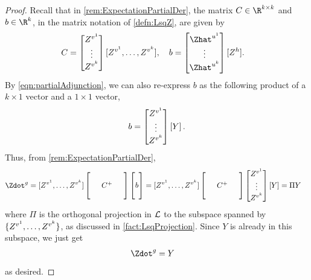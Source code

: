 \documentclass[main.tex]{subfiles}
\begin{document}
\begin{proof}
  Recall that in \cref{rem:ExpectationPartialDer}, the matrix $C\in \R^{k \times k}$ and $b \in \R^k$, in the matrix notation of \cref{defn:LsqZ}, are given by
  \begin{align*}
  C
    &=
      \begin{bmatrix}
      Z^{\vv^1}\\
      \vdots\\
      Z^{\vv^k}
      \end{bmatrix}
      [Z^{\vv^1}, \ldots,  Z^{\vv^{k}}]
      ,\quad
  b
    =
      \begin{bmatrix}
      \Zhat^{\uu^1}\\
      \vdots\\
      \Zhat^{\uu^k}
      \end{bmatrix}
      [Z^{h}]
      .
  \end{align*}
  By \cref{eqn:partialAdjunction}, we can also re-express $b$ as the following product of a $k \times 1$ vector and a $1 \times 1$ vector,
  \begin{equation*}
  b
    =
      \begin{bmatrix}
      Z^{v^1}\\
      \vdots\\
      Z^{v^k}
      \end{bmatrix}
      \left[ Y
      \right]
      .
  \end{equation*}
  Thus, from \cref{rem:ExpectationPartialDer},
  \begin{align*}
  \Zdot^{g}
    &=
      [Z^{\vv^1}, \ldots,  Z^{\vv^k}]
      \sqmat{C^+}
      \colmat{b}
    =
      [Z^{\vv^1}, \ldots,  Z^{\vv^k}]
      \sqmat{C^+}
      \begin{bmatrix}
      Z^{\vv^1}\\
      \vdots\\
      Z^{\vv^k}
      \end{bmatrix}
      [Y]
    =
      \Pi Y
  \end{align*}
  where $\Pi$ is the orthogonal projection in $\mathcal{L}$ to the subspace spanned by $\{ Z^{v^1}, \ldots,  Z^{v^k}\}$, as discussed in \cref{fact:LsqProjection}.
  Since $Y$ is already in this subspace, we just get
  \begin{align*}
  \Zdot^{g}
    &=
      Y
  \end{align*}
  as desired.


\end{proof}
\end{document}

